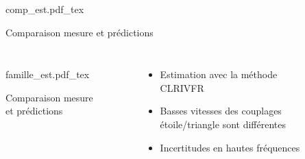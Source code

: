 \documentclass{style/presentation}
\begin{document}
\begin{frame}

    \begin{columns}[c]
        \begin{figure}
            \vspace{-3mm}
            \centering
            {\fontsize{6pt}{5pt}\selectfont
                \def\svgwidth{\textwidth}
                {comp_est.pdf_tex}}
            \caption{Comparaison mesure et prédictions}
        \end{figure}
        \centering
    \end{columns}
\end{frame}

\begin{frame}
    \begin{columns}[c]
        \begin{figure}
            \centering
            {\fontsize{6pt}{5pt}\selectfont
                \def\svgwidth{\textwidth}
                {famille_est.pdf_tex}}
            \caption{Comparaison mesure et prédictions}
        \end{figure}

        \begin{itemize}
            \item Estimation avec la méthode CLRIVFR
            \item Basses vitesses des couplages étoile/triangle sont différentes
            \item Incertitudes en hautes fréquences
        \end{itemize}
    \end{columns}
\end{frame}
\end{document}
